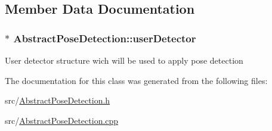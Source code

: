 \subsection{Member Data Documentation}
\hypertarget{classAbstractPoseDetection_a20dccd0d1494d1ef0ec896e996b5e70b}{
\subsubsection[{userDetector}]{$\ast$ {\bf AbstractPoseDetection::userDetector}}}
\label{classAbstractPoseDetection_a20dccd0d1494d1ef0ec896e996b5e70b}
User detector structure wich will be used to apply pose detection 

The documentation for this class was generated from the following files:\begin{DoxyCompactItemize}
\item 
src/\hyperlink{AbstractPoseDetection_8h}{AbstractPoseDetection.h}\item 
src/\hyperlink{AbstractPoseDetection_8cpp}{AbstractPoseDetection.cpp}\end{DoxyCompactItemize}
